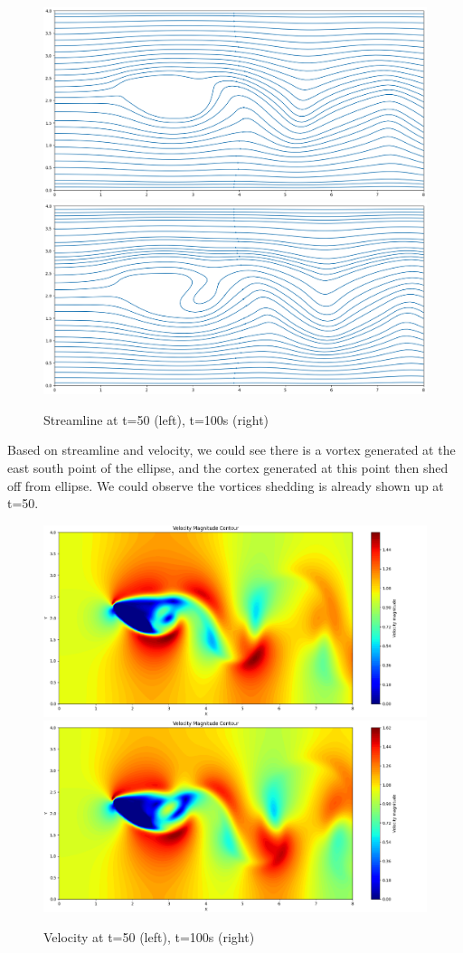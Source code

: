 \documentclass[12pt]{article}
\begin{document}
\begin{figure}[H]
    \centering
    \includegraphics[width=0.45\linewidth]{figure/Ellip_N32_Re300_8x4_t50/stline_Ellip_N32_Re300_8x4_t50.jpg}
    \includegraphics[width=0.45\linewidth]{figure/Ellip_N32_Re300_8x4_t100/stline_Ellip_N32_Re300_8x4_t100.jpg}
    \caption{Streamline at t=50 (left), t=100s (right)}
\end{figure}

Based on streamline and velocity, we could see there is a vortex generated at the east south point of the ellipse, and the cortex generated at this point then shed off from ellipse. We could observe the vortices shedding is already shown up at t=50.

\begin{figure}[H]
    \centering
    \includegraphics[width=0.45\linewidth]{figure/Ellip_N32_Re300_8x4_t50/v_Ellip_N32_Re300_8x4_t50.jpg}
    \includegraphics[width=0.45\linewidth]{figure/Ellip_N32_Re300_8x4_t100/v_Ellip_N32_Re300_8x4_t100.jpg}
    \caption{Velocity at t=50 (left), t=100s (right)}
\end{figure}
\end{document}
